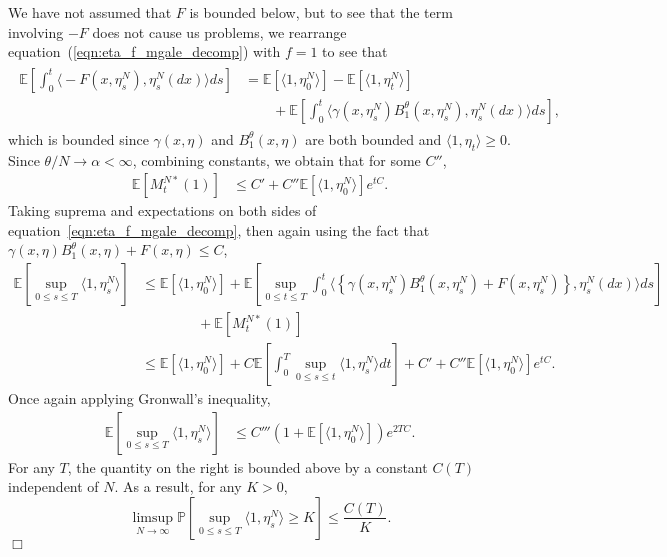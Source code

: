 \documentclass[12pt]{article}
\newenvironment {proof}{{\noindent\bf Proof }}{\hfill $\Box$ \medskip}
\newcommand{\IP}{\mathbb P}
\newcommand{\IE}{\mathbb E}
\numberwithin{equation}{section}
\begin{document}
\begin{proof}
	We have not assumed that $F$ is bounded below, but to see that the 
	term involving $-F$ does not cause us problems, we rearrange
	equation~(\ref{eqn:eta_f_mgale_decomp}) 
	with $f=1$ to see that
	\begin{align}
		\label{integral of -F}
        \begin{split}
\IE\left[\int_0^t \Big\langle -F(x, \eta^N_s), \eta^N_s(dx) \Big\rangle ds \right]
        &= \IE[\langle 1, \eta^N_0\rangle] -\IE[\langle 1,\eta^N_t\rangle]
            \\&\qquad {}
	+ \IE\left[\int_0^t\Big\langle \gamma(x,\eta_s^N) B^\theta_1(x, \eta_s^N),\eta_s^N(dx)\Big\rangle ds\right],
        \end{split}
	\end{align}
which is bounded since $\gamma (x,\eta)$ and $B^\theta_1(x,\eta)$ are both bounded and 
$\langle 1,\eta_t\rangle\geq 0$. 
    Since $\theta/N \to \alpha < \infty$,
    combining constants, we obtain that for some $C''$,
    \begin{align*}
        \IE\left[ M^{N*}_t(1) \right]
        &\le
        C' + C'' \IE[ \langle 1, \eta_0^N \rangle ] e^{tC} .
    \end{align*}
    Taking suprema and expectations on both sides of equation~\eqref{eqn:eta_f_mgale_decomp},
    then again using the fact that $\gamma(x, \eta) B^\theta_1(x, \eta) + F(x, \eta) \le C$,
    \begin{align*}
        \IE\left[\sup_{0 \le s \le T} \langle 1, \eta^N_s \rangle \right]
        &\le
        \IE[\langle 1, \eta^N_0 \rangle]
        + \IE\left[
            \sup_{0 \le t \le T}
            \int_0^t 
	    \Big\langle\left\{
                \gamma(x, \eta^N_s)
                B^\theta_1(x, \eta^N_s)
                + F(x, \eta^N_s)
            \right\}, \eta^N_s(dx) \Big\rangle ds
        \right]
        \\ & \qquad\qquad {}
        + \IE[M^{N*}_t(1)] 
        \\
        &\le
        \IE[\langle 1, \eta^N_0 \rangle]
        + C \IE\left[
            \int_0^T \sup_{0 \le s \le t} \langle 1, \eta^N_s \rangle dt
        \right]
        + C' + C'' \IE[ \langle 1, \eta_0^N \rangle ] e^{tC} .
    \end{align*}
    Once again applying Gronwall's inequality,
    \begin{align*}
        \IE\left[\sup_{0 \le s \le T} \langle 1, \eta^N_s \rangle \right]
        &\le
        C''' 
        \left(1+ \IE[\langle 1, \eta^N_0 \rangle]\right) e^{2TC} .
    \end{align*}
    For any $T$,
    the quantity on the right is bounded above by a constant $C(T)$ independent of $N$.
    As a result, for any $K > 0$,
    \begin{equation*}
    \limsup_{N \to \infty}
        \IP\left[ \sup_{0 \le s \le T} \langle 1, \eta^{N}_{s} \rangle \geq K \right]
        \leq
        \frac{C(T)}{K}.
    \end{equation*}
\end{proof}
\end{document}
